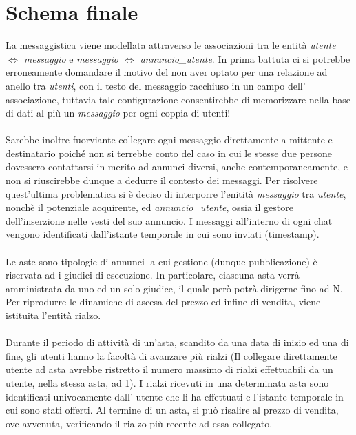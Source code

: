 \documentclass[a4paper,12pt]{report}
\begin{document}
    	\section{Schema finale}
        La messaggistica viene modellata attraverso le associazioni tra le entità \textit{utente $\Leftrightarrow$ messaggio} e 
        \textit{messaggio $\Leftrightarrow$ annuncio\_utente}. In prima battuta ci si potrebbe erroneamente domandare il motivo 
        del non aver optato per una relazione ad anello tra \textit{utenti}, con il testo del messaggio racchiuso in un campo 
        dell’ associazione, tuttavia tale configurazione consentirebbe di memorizzare nella base di dati al più un 
        \textit{messaggio} per ogni coppia di utenti! \\
        \\
        Sarebbe inoltre fuorviante collegare ogni messaggio direttamente 
        a mittente e destinatario poiché non si terrebbe conto del caso in cui le stesse due persone dovessero contattarsi in merito ad annunci 
        diversi, anche contemporaneamente, e non si riuscirebbe dunque a dedurre il contesto dei messaggi. Per risolvere quest’ultima problematica 
        si è deciso di interporre l'enitità \textit{messaggio} tra \textit{utente}, nonchè il potenziale acquirente, ed \textit{annuncio\_utente}, 
        ossia il gestore dell’inserzione nelle vesti del suo annuncio. I messaggi all’interno di ogni chat vengono identificati dall’istante 
        temporale in cui sono inviati (timestamp). \\
        \\
        Le aste sono tipologie di annunci la cui gestione (dunque pubblicazione) è riservata ad i giudici di esecuzione.
        In particolare, ciascuna asta verrà amministrata da uno ed un solo giudice, il quale però potrà dirigerne fino ad N.
        Per riprodurre le dinamiche di ascesa del prezzo ed infine di vendita, viene istituita l’entità rialzo. \\
        \\
        Durante il periodo di attività di un’asta, scandito da una data di inizio ed una di fine, gli utenti hanno la facoltà di avanzare più rialzi 
        (Il collegare direttamente utente ad asta avrebbe ristretto il numero massimo di rialzi effettuabili da un utente, nella stessa asta, ad 1).
        I rialzi ricevuti in una determinata asta sono identificati univocamente dall’ utente che li ha effettuati e l’istante temporale in cui sono 
        stati offerti. Al termine di un asta, si può risalire al prezzo di vendita, ove avvenuta, verificando il rialzo più recente ad essa collegato.
\end{document}

